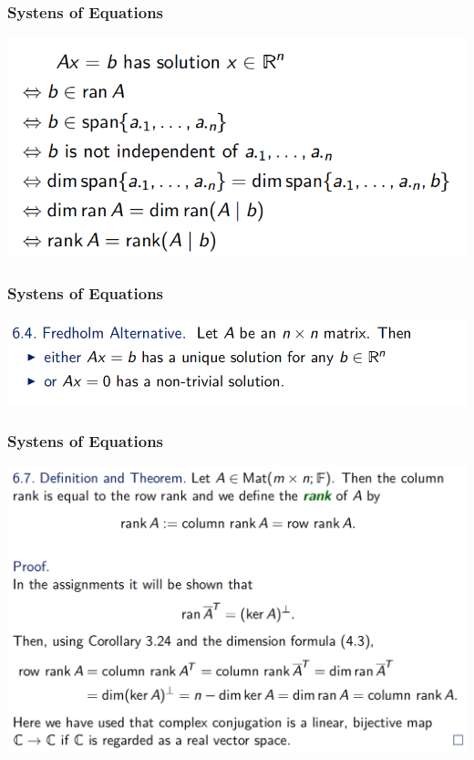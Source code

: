 \documentclass[12pt, t]{beamer}
\begin{document}
\begin{frame}
    \frametitle{Systens of Equations}
    \begin{center}
        \includegraphics[width=\textwidth]{4}
    \end{center}
\end{frame}

\begin{frame}
    \frametitle{Systens of Equations}
    \begin{center}
        \includegraphics[width=\textwidth]{7}
    \end{center}
\end{frame}

\begin{frame}
    \frametitle{Systens of Equations}
    \begin{center}
        \includegraphics[width=\textwidth]{5}
    \end{center}
\end{frame}
\end{document}
